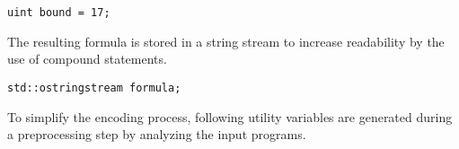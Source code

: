 \begin{lstlisting}[style=c++]
uint bound = 17;
\end{lstlisting}
The resulting formula is stored in a string stream to increase readability by the use of compound statements.
\begin{lstlisting}[style=c++]
std::ostringstream formula;
\end{lstlisting}
To simplify the encoding process, following utility variables are generated during a preprocessing step by analyzing the input programs.
